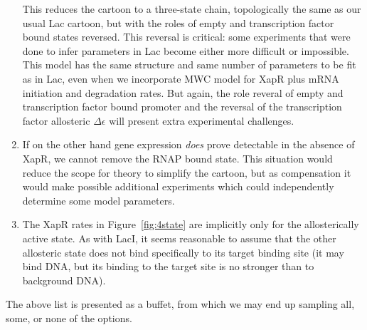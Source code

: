 \documentclass[12pt]{article}%
\newcommand{\fref}[1]{Figure~\ref{#1}}
\begin{document}
\begin{enumerate}
        This reduces the cartoon to a three-state chain, topologically the same as our usual Lac cartoon,
        but with the roles of empty and transcription factor bound states reversed.
        This reversal is critical: some experiments that were done to infer parameters in Lac
        become either more difficult or impossible.
        This model has the same structure and same number of parameters to be fit as in Lac,
        even when we incorporate MWC model for XapR plus mRNA initiation and degradation rates.
        But again, the role reveral of empty and transcription factor bound promoter
        and the reversal of the transcription factor allosteric $\Delta\epsilon$
        will present extra experimental challenges.
    \item If on the other hand gene expression \textit{does} prove detectable in the absence of XapR,
        we cannot remove the RNAP bound state.
        This situation would reduce the scope for theory to simplify the cartoon,
        but as compensation it would make possible additional experiments
        which could independently determine some model parameters.
    \item The XapR rates in \fref{fig:4state} are implicitly only for the allosterically active state.
        As with LacI, it seems reasonable to assume that the other allosteric state
        does not bind specifically to its target binding site
        (it may bind DNA, but its binding to the target site is no stronger than to background DNA).
\end{enumerate}

The above list is presented as a buffet,
from which we may end up sampling all, some, or none of the options.
\end{document}
